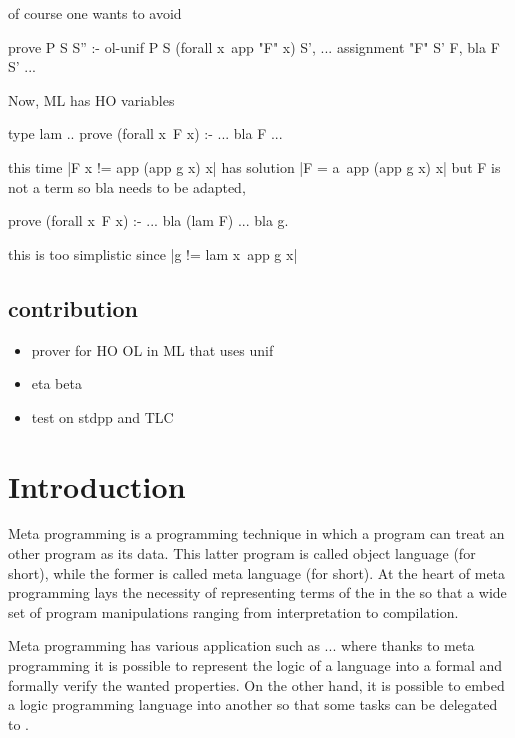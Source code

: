 \documentclass{rapport}
\begin{document}
of course one wants to avoid
\begin{elpicode}
prove P S S'' :- ol-unif P S (forall x\ app "F" x) S', ... assignment "F" S' F, bla F S' ...
\end{elpicode}

Now, ML has HO variables
\begin{elpicode}
type lam ..
prove (forall x\ F x) :- ... bla F ...
\end{elpicode}
this time  |F x != app (app g x) x| has solution
|F = a\ app (app g x) x| but F is not a term so
bla needs to be adapted,
\begin{elpicode}
prove (forall x\ F x) :- ... bla (lam F) ...
bla g.
\end{elpicode}
this is too simplistic since |g != lam x\ app g x|

\subsection{contribution}
\begin{itemize}
\item prover for HO OL in ML that uses unif
\item eta beta
\item test on stdpp and TLC
\end{itemize}


\section{Introduction}

Meta programming \cite{hill1994} is a programming technique in which a program
can treat an other program as its data. This latter program is called object
language (\ol for short), while the former is called meta language (\ml for
short). At the heart of meta programming lays the necessity of representing
terms of the \ol in the \ml so that a wide set of program
manipulations ranging from interpretation to compilation. 

Meta programming has various application such as ... where thanks to meta
programming it is possible to represent the logic of a language into a formal
and formally verify the wanted properties. On the other hand, it is possible to
embed a logic programming language into another so that some tasks can be
delegated to \ml.
\end{document}
